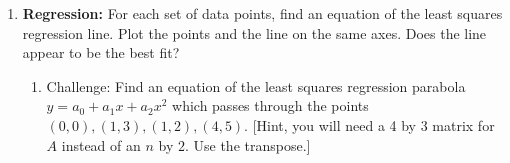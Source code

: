 \begin{enumerate}
\item {\bf Regression:} \label{regression}For each set of data points, find an equation of the least squares regression line. Plot the points and the line on the same axes. Does the line appear to be the best fit?

\begin{enumerate}
\item Challenge: Find an equation of the least squares regression parabola $y=a_0+a_1x+a_2x^2$ which passes through the points $(0,0),(1,3),(1,2),(4,5)$. [Hint, you will need a 4 by 3 matrix for $A$ instead of an $n$ by $2$. Use the transpose.]
\end{enumerate}














\end{enumerate}
